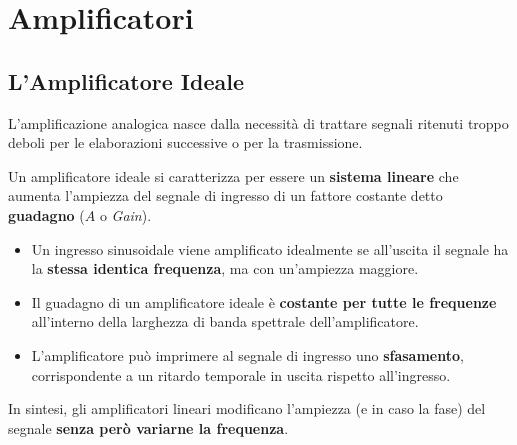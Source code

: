 \documentclass[openany,a4paper,12pt]{book}
\begin{document}
\begin{figure}[H]
{%
    }
\end{figure}



\section{Amplificatori}

\subsection*{L'Amplificatore Ideale}

L'amplificazione analogica nasce dalla necessità di trattare segnali ritenuti troppo deboli per le elaborazioni successive o per la trasmissione. 

Un amplificatore ideale si caratterizza per essere un \textbf{sistema lineare} che aumenta l'ampiezza del segnale di ingresso di un fattore costante detto \textbf{guadagno} ($A$ o \textit{Gain}). 
\begin{itemize}[label=\textcolor{PoliBlue}{\textbullet}]
    \item Un ingresso sinusoidale viene amplificato idealmente se all'uscita il segnale ha la \textbf{stessa identica frequenza}, ma con un'ampiezza maggiore. 
    \item Il guadagno di un amplificatore ideale è \textbf{costante per tutte le frequenze} all'interno della larghezza di banda spettrale dell'amplificatore.
    \item L'amplificatore può imprimere al segnale di ingresso uno \textbf{sfasamento}, corrispondente a un ritardo temporale in uscita rispetto all'ingresso.
\end{itemize}
In sintesi, gli amplificatori lineari modificano l'ampiezza (e in caso la fase) del segnale \textbf{senza però variarne la frequenza}.
\end{document}
